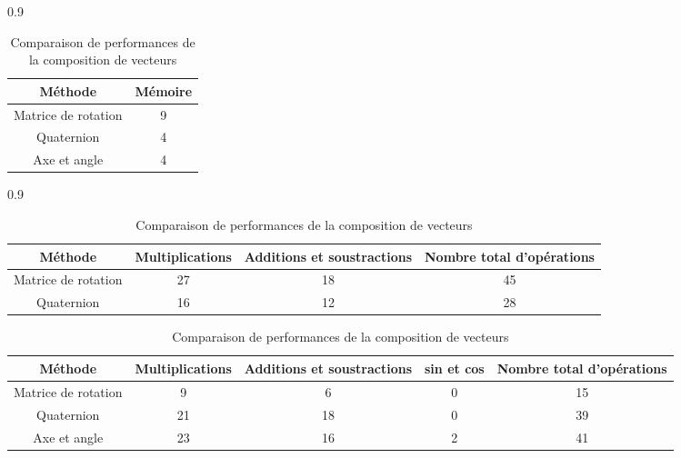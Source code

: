 \begin{savenotes}
\begin{table}[ht]
	\centering
		\begin{subtable}[t][4cm]{0.9\linewidth}
			\centering
			\begin{tabular}{cc}
				Méthode & Mémoire \\
				\toprule
				Matrice de rotation & 9 \\
				\midrule
				Quaternion & 4 \\
				\midrule
				Axe et angle & 4\fnoteone \\
				\bottomrule
			\end{tabular}
			\caption{Utilisation en mémoire}
			\label{memoire}
		\end{subtable}
	
	\begin{subtable}[t][4cm]{0.9\linewidth}
		\centering
		\begin{tabular}{cccc}
			Méthode & Multiplications & Additions et soustractions & Nombre total d'opérations \\
			\toprule
			Matrice de rotation & 27 & 18 & 45 \\
			\midrule
			Quaternion & 16 & 12 & 28 \\
			\bottomrule
		\end{tabular}
		\caption{Comparaison de performances de la composition de rotations}
		\label{performances_rotations}
	\end{subtable}

	\begin{subtable}[t][3cm]{\linewidth}
		\centering
		\begin{tabular}{ccccc}
			Méthode & Multiplications & Additions et soustractions & sin et cos & Nombre total d'opérations \\
			\toprule
			Matrice de rotation & 9 & 6 & 0 & 15 \\
			\midrule
			Quaternion & 21 & 18 & 0 & 39 \\
			\midrule
			Axe et angle & 23 & 16 & 2 & 41 \\
			\bottomrule
		\end{tabular}
		\caption{Comparaison de performances de la composition de vecteurs}
		\label{performances_vecteurs}
	\end{subtable}
\end{table}
\end{savenotes}

\clearpage